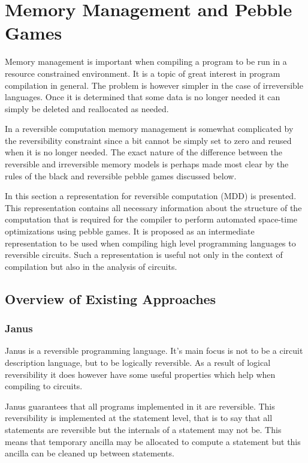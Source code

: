 \chapter{Memory Management and Pebble Games}

Memory management is important when compiling a program to be run in a resource
constrained environment. It is a topic of great interest in program compilation
in general. The problem is however simpler in the case of irreversible
languages. Once it is determined that some data is no longer needed it can
simply be deleted and reallocated as needed.

In a reversible computation memory management is somewhat complicated by the
reversibility constraint since a bit cannot be simply set to zero and reused
when it is no longer needed. The exact nature of the difference between the
reversible and irreversible memory models is perhaps made most clear by the
rules of the black and reversible pebble games discussed below.

In this section a representation for reversible computation (MDD) is presented.
This representation contains all necessary information about the structure of
the computation that is required for the compiler to perform automated
space-time optimizations using pebble games. It is proposed as an
intermediate representation to be used when compiling high level programming
languages to reversible circuits. 
Such a representation is useful not only in the context of compilation but also in the analysis of circuits.

\section{Overview of Existing Approaches}

\subsection{Janus\label{sec:janus}} 

Janus\cite{YG:2007,LD:1982} is a reversible programming language.  It's main
focus is not to be a circuit description language, but to be logically
reversible. As a result of logical reversibility it does however have some
useful properties which help when compiling to circuits.

Janus guarantees that all programs implemented in it are reversible.
This reversibility is implemented at the statement level, that is to say that
all statements are reversible but the internals of a statement may not be.
This means that temporary ancilla may be allocated to compute a statement but
this ancilla can be cleaned up between statements.

